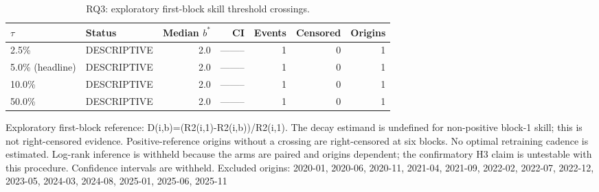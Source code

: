 \begin{table}[!t]
\centering
\caption{RQ3: exploratory first-block skill threshold crossings.}
\label{tab:decay}
\begin{tabular}{llrrrrr}
\toprule
$\tau$ & Status & Median $b^{*}$ & CI & Events & Censored & Origins \\
\midrule
2.5\% & DESCRIPTIVE & 2.0 & -------- & 1 & 0 & 1 \\
5.0\% (headline) & DESCRIPTIVE & 2.0 & -------- & 1 & 0 & 1 \\
10.0\% & DESCRIPTIVE & 2.0 & -------- & 1 & 0 & 1 \\
50.0\% & DESCRIPTIVE & 2.0 & -------- & 1 & 0 & 1 \\
\bottomrule
\end{tabular}
\vspace{2pt}\par\footnotesize Exploratory first-block reference: D(i,b)=(R2(i,1)-R2(i,b))/R2(i,1). The decay estimand is undefined for non-positive block-1 skill; this is not right-censored evidence. Positive-reference origins without a crossing are right-censored at six blocks. No optimal retraining cadence is estimated. Log-rank inference is withheld because the arms are paired and origins dependent; the confirmatory H3 claim is untestable with this procedure. Confidence intervals are withheld. Excluded origins: 2020-01, 2020-06, 2020-11, 2021-04, 2021-09, 2022-02, 2022-07, 2022-12, 2023-05, 2024-03, 2024-08, 2025-01, 2025-06, 2025-11
\end{table}
